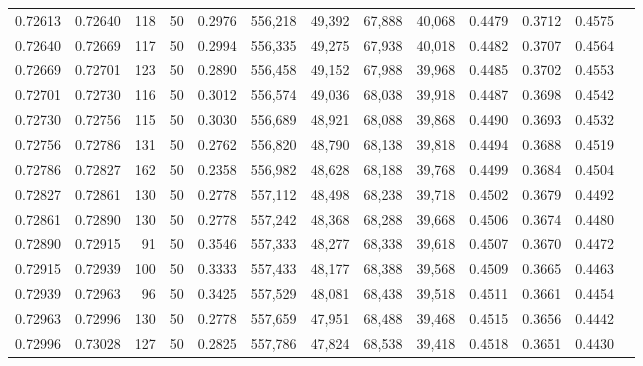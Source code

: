 \begin{tabular}{rrrrrrrrrrrrr}
0.72613 & 0.72640 &   118 &  50 &                                     0.2976 & 556,218 &  49,392 &  67,888 &  40,068 & 0.4479 & 0.3712 & 0.4575 \\
0.72640 & 0.72669 &   117 &  50 &                                     0.2994 & 556,335 &  49,275 &  67,938 &  40,018 & 0.4482 & 0.3707 & 0.4564 \\
0.72669 & 0.72701 &   123 &  50 &                                     0.2890 & 556,458 &  49,152 &  67,988 &  39,968 & 0.4485 & 0.3702 & 0.4553 \\
0.72701 & 0.72730 &   116 &  50 &                                     0.3012 & 556,574 &  49,036 &  68,038 &  39,918 & 0.4487 & 0.3698 & 0.4542 \\
0.72730 & 0.72756 &   115 &  50 &                                     0.3030 & 556,689 &  48,921 &  68,088 &  39,868 & 0.4490 & 0.3693 & 0.4532 \\
0.72756 & 0.72786 &   131 &  50 &                                     0.2762 & 556,820 &  48,790 &  68,138 &  39,818 & 0.4494 & 0.3688 & 0.4519 \\
0.72786 & 0.72827 &   162 &  50 &                                     0.2358 & 556,982 &  48,628 &  68,188 &  39,768 & 0.4499 & 0.3684 & 0.4504 \\
0.72827 & 0.72861 &   130 &  50 &                                     0.2778 & 557,112 &  48,498 &  68,238 &  39,718 & 0.4502 & 0.3679 & 0.4492 \\
0.72861 & 0.72890 &   130 &  50 &                                     0.2778 & 557,242 &  48,368 &  68,288 &  39,668 & 0.4506 & 0.3674 & 0.4480 \\
0.72890 & 0.72915 &    91 &  50 &                                     0.3546 & 557,333 &  48,277 &  68,338 &  39,618 & 0.4507 & 0.3670 & 0.4472 \\
0.72915 & 0.72939 &   100 &  50 &                                     0.3333 & 557,433 &  48,177 &  68,388 &  39,568 & 0.4509 & 0.3665 & 0.4463 \\
0.72939 & 0.72963 &    96 &  50 &                                     0.3425 & 557,529 &  48,081 &  68,438 &  39,518 & 0.4511 & 0.3661 & 0.4454 \\
0.72963 & 0.72996 &   130 &  50 &                                     0.2778 & 557,659 &  47,951 &  68,488 &  39,468 & 0.4515 & 0.3656 & 0.4442 \\
0.72996 & 0.73028 &   127 &  50 &                                     0.2825 & 557,786 &  47,824 &  68,538 &  39,418 & 0.4518 & 0.3651 & 0.4430 \\

\end{tabular}
